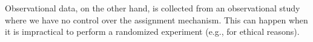 \PP Observational data, on the other hand, is collected from an observational study where we have no control over the assignment mechanism. This can happen when it is impractical to perform a randomized experiment (e.g., for ethical reasons). 


\PP \citep{rosenbaum1983central}





